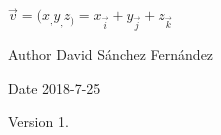 $ \vec{v} = (x_, y_, z_) = x_ \vec{i} + y_ \vec{j} + z_ \vec{k} $ \begin{DoxyAuthor}{Author}
David Sánchez Fernández 
\end{DoxyAuthor}
\begin{DoxyDate}{Date}
2018-\/7-\/25 
\end{DoxyDate}
\begin{DoxyVersion}{Version}
1. 
\end{DoxyVersion}
